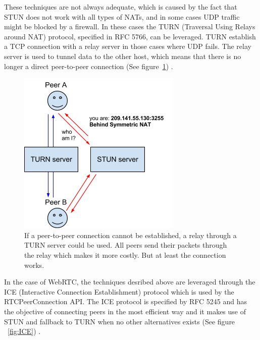 These techniques are not always adequate, which is caused by the fact that STUN does not work with all types of NATs, and in some cases UDP traffic might be blocked by a firewall. In these cases the TURN (Traversal Using Relays around NAT) protocol, specified in RFC 5766, can be leveraged.  TURN establish a TCP connection with a relay server in those cases where UDP fails. The relay server is used to tunnel data to the other host, which means that there is no longer a direct peer-to-peer connection (See figure~\ref{fig:WebRTC - TURN}) \cite{RFC5766:Online}.

\begin{figure}[htp]
\centering
\includegraphics[width=\textwidth,height=0.2\paperheight,keepaspectratio
]{figures/webrtc-turn}
\caption{If a peer-to-peer connection cannot be established, a relay through a TURN server could be used. All peers send their packets through the relay which makes it more costly. But at least the connection works\cite{WebRTCArchitecture:2014:Online}.}
\label{fig:WebRTC - TURN}
\end{figure}

In the case of WebRTC, the techniques desribed above are leveraged through the ICE (Interactive Connection Establishment) protocol which is used by the RTCPeerConnection API. The ICE protocol is specified by RFC 5245 and has the objective of connecting peers in the most efficient way and it makes use of STUN and fallback to TURN when no other alternatives exists (See figure ~\ref{fig:ICE}) \cite{RFC5245:Online}.

